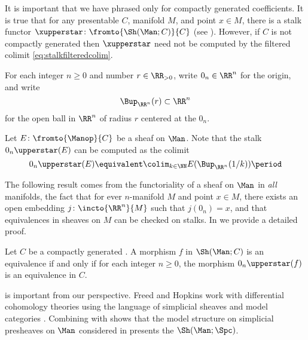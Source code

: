 \begin{warning}
	It is important that we have phrased  only for compactly generated coefficients.
	It is true that for any presentable \category $ C $, manifold $ M $, and point $ x \in M $, there is a stalk functor $ \xupperstar \colon \fromto{\Sh(\Man;C)}{C} $ (see ).
	However, if $ C $ is not compactly generated then $ \xupperstar $ need not be computed by the filtered colimit \eqref{eq:stalkfilteredcolim}.
\end{warning}

\begin{notation}\label{ntn:origin}
	For each integer $ n \geq 0 $ and number $ r \in \RR_{>0} $, write $ 0_n \in \RR^n $ for the origin, and write
	\begin{equation*}
		\Bup_{\RR^n}(r) \subset \RR^n
	\end{equation*}
	for the open ball in $ \RR^n $ of radius $ r $ centered at the $ 0_n $.
\end{notation}

\begin{nul}
	Let $ E \colon \fromto{\Manop}{C} $ be a sheaf on $ \Man $.
	Note that the stalk $ 0_n\upperstar(E) $ can be computed as the colimit
	\begin{equation*}
		0_n\upperstar(E) \equivalent \colim_{k \in \NN} E(\Bup_{\RR^n}(1/k)) \period
	\end{equation*}
\end{nul}

The following result comes from the functoriality of a sheaf on $ \Man $ in \textit{all} manifolds, the fact that for ever $ n $-manifold $ M $ and point $ x \in M $, there exists an open embedding $ j \colon \incto{\RR^n}{M} $ such that $ j(0_n) = x $, and that equivalences in sheaves on $ M $ can be checked on stalks.
In  we provide a detailed proof.

\begin{proposition}\label{prop:hypercompleteness}
	Let $ C $ be a compactly generated \category.
	A morphism $ f $ in $ \Sh(\Man;C) $ is an equivalence if and only if for each integer $ n \geq 0 $, the morphism $ 0_n\upperstar(f) $ is an equivalence in $ C $.
\end{proposition}

\begin{remark}\label{rem:FreedHopkinsmodel}
	 is important from our perspective.
	Freed and Hopkins work with differential cohomology theories using the language of simplicial sheaves and model categories \cite{MR3049871}.  
	Combining  with \cite[ \& ]{HTT} shows that the model structure on simplicial presheaves on $ \Man $ considered in \cite[§5]{MR3049871} presents the \category $ \Sh(\Man;\Spc) $.
\end{remark}

